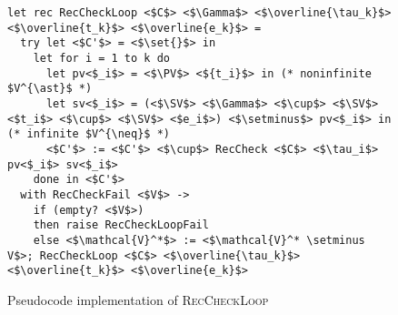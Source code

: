 \begin{figure}
\centering

\begin{verbatim}
let rec RecCheckLoop <$C$> <$\Gamma$> <$\overline{\tau_k}$> <$\overline{t_k}$> <$\overline{e_k}$> =
  try let <$C'$> = <$\set{}$> in
    let for i = 1 to k do
      let pv<$_i$> = <$\PV$> <${t_i}$> in (* noninfinite $V^{\ast}$ *)
      let sv<$_i$> = (<$\SV$> <$\Gamma$> <$\cup$> <$\SV$> <$t_i$> <$\cup$> <$\SV$> <$e_i$>) <$\setminus$> pv<$_i$> in (* infinite $V^{\neq}$ *)
      <$C'$> := <$C'$> <$\cup$> RecCheck <$C$> <$\tau_i$> pv<$_i$> sv<$_i$>
    done in <$C'$>
  with RecCheckFail <$V$> ->
    if (empty? <$V$>)
    then raise RecCheckLoopFail
    else <$\mathcal{V}^*$> := <$\mathcal{V}^* \setminus V$>; RecCheckLoop <$C$> <$\overline{\tau_k}$> <$\overline{t_k}$> <$\overline{e_k}$>
\end{verbatim}

\caption{Pseudocode implementation of \textsc{RecCheckLoop}}
\label{fig:helpers}
\end{figure}

